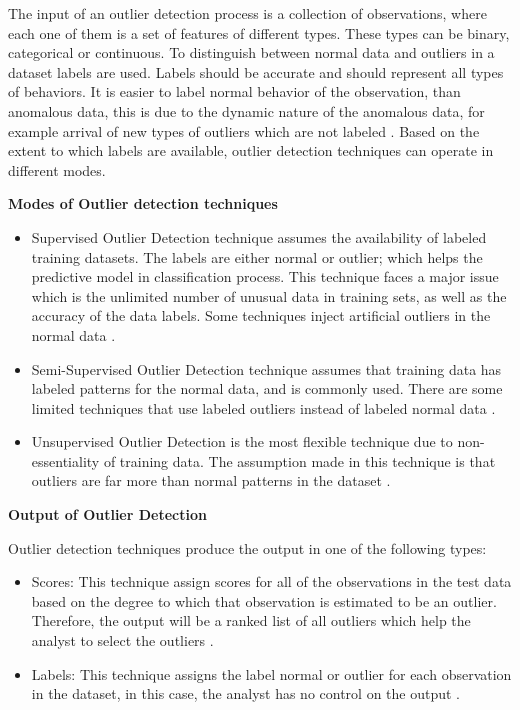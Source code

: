 The input of an outlier detection process is a collection of observations, where each one of them is a set of features of different types. These types can be binary, categorical or continuous. 
To distinguish between normal data and outliers in a dataset labels are used. Labels should be accurate and should represent all types of behaviors. It is easier to label normal behavior of the observation, than anomalous data, this is due to the dynamic nature of the anomalous data, for example arrival of new types of outliers which are not labeled \citep{Survey}. Based on the extent to which labels are available, outlier detection techniques can operate in different modes.

\textbf{Modes of Outlier detection techniques}
\begin{itemize}
\item{Supervised Outlier Detection}
technique assumes the availability of labeled training datasets. The labels are either normal or outlier; which helps the predictive model in classification process. This technique faces a major issue which is the unlimited number of unusual data in training sets, as well as the accuracy of the data labels. Some techniques inject artificial outliers in the normal data \citep{Kurukshetra}. 
\item{Semi-Supervised Outlier Detection}
technique assumes that training data has labeled patterns for the normal data, and is commonly used. There are some limited techniques that use labeled outliers instead of labeled normal data \citep{Kurukshetra}.
\item{Unsupervised Outlier Detection}
is the most flexible technique due to non-essentiality of training data. The assumption made in this technique is that outliers are far more than normal patterns in the dataset \citep{Kurukshetra}.
\end{itemize}

\textbf{Output of Outlier Detection}

Outlier detection techniques produce the output in one of the following types:
\begin{itemize}
\item{Scores:}
This technique assign scores for all of the observations in the test data based on the degree to which that observation is estimated to be an outlier. Therefore, the output will be a ranked list of all outliers which help the analyst to select the outliers \citep{Kurukshetra}.
\item{Labels:}
This technique assigns the label normal or outlier for each observation in the dataset, in this case, the analyst has no control on the output \citep{Kurukshetra}.
\end{itemize}

